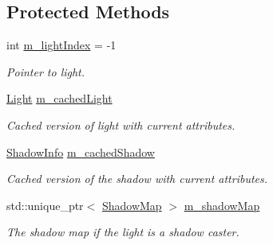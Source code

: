 \subsection*{Protected Methods}
\begin{DoxyCompactItemize}
\item 
\mbox{\label{classrev_1_1_light_component_a49c27bb6034aec60ae5635dd8402e612}} 
int \mbox{\hyperlink{classrev_1_1_light_component_a49c27bb6034aec60ae5635dd8402e612}{m\+\_\+light\+Index}} = -\/1
\begin{DoxyCompactList}\small\item\em Pointer to light. \end{DoxyCompactList}\item 
\mbox{\label{classrev_1_1_light_component_ae0af1196bd7a2c219a69fb867e6bea75}} 
\mbox{\hyperlink{classrev_1_1_light}{Light}} \mbox{\hyperlink{classrev_1_1_light_component_ae0af1196bd7a2c219a69fb867e6bea75}{m\+\_\+cached\+Light}}
\begin{DoxyCompactList}\small\item\em Cached version of light with current attributes. \end{DoxyCompactList}\item 
\mbox{\label{classrev_1_1_light_component_a3dc97a2f42e4b0b6c94ff3e654d7cf09}} 
\mbox{\hyperlink{structrev_1_1_shadow_info}{Shadow\+Info}} \mbox{\hyperlink{classrev_1_1_light_component_a3dc97a2f42e4b0b6c94ff3e654d7cf09}{m\+\_\+cached\+Shadow}}
\begin{DoxyCompactList}\small\item\em Cached version of the shadow with current attributes. \end{DoxyCompactList}\item 
\mbox{\label{classrev_1_1_light_component_a9038329c9a0c6528eab97b6c6bee89fc}} 
std\+::unique\+\_\+ptr$<$ \mbox{\hyperlink{classrev_1_1_shadow_map}{Shadow\+Map}} $>$ \mbox{\hyperlink{classrev_1_1_light_component_a9038329c9a0c6528eab97b6c6bee89fc}{m\+\_\+shadow\+Map}}
\begin{DoxyCompactList}\small\item\em The shadow map if the light is a shadow caster. \end{DoxyCompactList}\item 

\end{DoxyCompactItemize}
